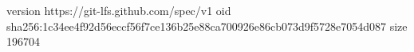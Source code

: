 version https://git-lfs.github.com/spec/v1
oid sha256:1c34ee4f92d56eccf56f7ce136b25e88ca700926e86cb073d9f5728e7054d087
size 196704
